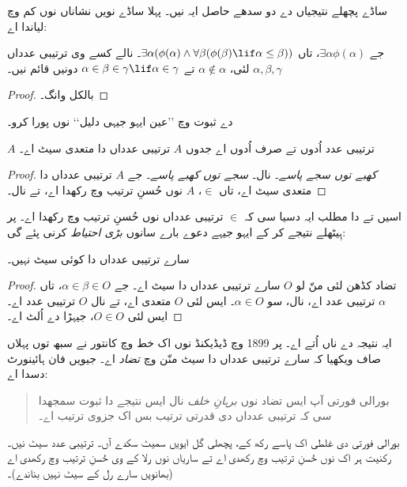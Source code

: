 \documentclass[../../../include/open-logic-section]{subfiles}
\begin{document}
ساڈے پچھلے نتیجیاں دے دو سدھے حاصل ایہ نیں۔ پہلا ساڈے نویں نشاناں نوں کم وچ لیاندا اے:

\begin{cor}
جے $\exists \alpha\phi(\alpha)$، تاں $\exists \alpha(\phi(\alpha)
\land \forall \beta(\phi(\beta) \lif \alpha \leq \beta))$۔
نالے کسے وی ترتیبی عدداں $\alpha, \beta, \gamma$ لئی،
$\alpha \notin \alpha$ تے $\alpha \in \beta \in \gamma \lif \alpha \in \gamma$
دونیں قائم نیں۔
\end{cor}

\begin{proof}
بالکل  وانگ۔
\end{proof}

\begin{prob}
 دے ثبوت وچ ’’عین ایہو جیہی دلیل‘‘
نوں پورا کرو۔
\end{prob}

\begin{cor}
$A$ ترتیبی عدد اُدوں تے صرف اُدوں اے جدوں $A$ ترتیبی عدداں دا متعدی سیٹ اے۔
\end{cor}

\begin{proof}
\emph{کھبے توں سجے پاسے۔}  نال۔
\emph{سجے توں کھبے پاسے۔} جے $A$ ترتیبی عدداں دا متعدی سیٹ اے، تاں
$\in$، $A$ نوں حُسنِ ترتیب وچ رکھدا اے،
 تے  نال۔
\end{proof}

اسیں  تے  دا مطلب ایہ دسیا سی
کہ $\in$ ترتیبی عدداں نوں حُسنِ ترتیب وچ رکھدا اے۔ پر ہِیٹھلے نتیجے کر کے
ایہو جیہے دعوے بارے سانوں \emph{بڑی احتیاط} کرنی پئے گی:

\begin{thm}
سارے ترتیبی عدداں دا کوئی سیٹ نہیں۔
\end{thm}

\begin{proof}
تضاد کڈھن لئی منّ لو $O$ سارے ترتیبی عدداں دا سیٹ اے۔ جے
$\alpha \in \beta \in O$، تاں $\alpha$ ترتیبی عدد اے، 
نال، سو $\alpha \in O$۔ ایس لئی $O$ متعدی اے، تے 
نال $O$ ترتیبی عدد اے۔ ایس لئی $O \in O$، جیہڑا
 دے اُلٹ اے۔
\end{proof}
\noindent
ایہ نتیجہ \citeauthor{Burali-Forti1897} دے ناں اُتے اے۔ پر 1899 وچ ڈیڈیکنڈ
نوں اک خط وچ کانتور نے سبھ توں پہلاں صاف ویکھیا کہ سارے ترتیبی عدداں دا
سیٹ منّن وچ \emph{تضاد} اے۔ جیویں فان ہائینورٹ دسدا اے:
\begin{quote}
  بورالی فورتی آپ ایس تضاد نوں \emph{برہانِ خلف} نال ایس نتیجے دا ثبوت
  سمجھدا سی کہ ترتیبی عدداں دی قدرتی ترتیب بس اک جزوی ترتیب اے۔
  \citep[p.~105]{Heijenoort1967}
\end{quote}
بورالی فورتی دی غلطی اک پاسے رکھ کے، پچھلی گل ایویں سمیٹ سکدے آں۔
ترتیبی عدد سیٹ نیں۔ رکنیت ہر اک نوں حُسنِ ترتیب وچ رکھدی اے تے
ساریاں نوں رلا کے وی حُسنِ ترتیب وچ رکھدی اے (بھانویں سارے رل کے سیٹ
نہیں بناندے)۔
\end{document}
